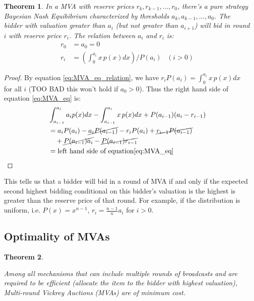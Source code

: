 \documentclass{aamas2012}
\newtheorem{theorem}{Theorem}
\begin{document}
\begin{theorem}
In a MVA with reserve prices $r_k, r_{k-1}, \ldots, r_0$, there's a pure
strategy Bayesian Nash Equibibrium characterized by thresholds $a_k, a_{k-1},
\ldots, a_0$.  The bidder with valuation greater than $a_i$ (but not greater
than $a_{i+1}$) will bid in round $i$ with reserve price $r_i$. The relation
between $a_i$ and $r_i$ is:
\begin{align}\label{eq:MVA_eq_relation}
  r_0 &= a_0 = 0 \nonumber \\
  r_i &= \left( \int_{0}^{a_i} x \, p(x) dx \right) / P(a_i) & (i > 0)
\end{align}
\end{theorem}

\begin{proof}
By equation \ref{eq:MVA_eq_relation}, we have $r_i P(a_i) = \int_{0}^{a_i}
x\,p(x)dx$ for all $i$ (TOO BAD this won't hold if $a_0 > 0$). Thus the right
hand side of equation \ref{eq:MVA_eq} is:
\begin{align*}
	& \int_{a_{i-1}}^{a_i} a_i p(x) dx - \int_{a_{i-1}}^{a_i} x \, p(x) dx + P(a_{i-1})(a_i-r_{i-1}) \\
	&= a_i P(a_i) - \cancel{a_i P(a_{i-1})} - r_i P(a_i) + \cancel{r_{i-1} P(a_{i-1})} \\
		& ~~~ + \cancel{P(a_{i-1}) a_i} - \cancel{P(a_{i-1}) r_{i-1}}\\
	&= \mbox{left hand side of equation\ref{eq:MVA_eq}}
\end{align*}
\end{proof}

This tells us that a bidder will bid in a round of MVA if and only if the
expected second highest bidding conditional on this bidder's valuation is the
highest is greater than the reserve price of that round. For example, if the
distribution is uniform, i.e. $P(x) = x^{n-1}$, $r_i = \frac{n-1}{n} a_i$ for
$i > 0$.

\subsection{Optimality of MVAs}

\begin{theorem}\label{theorem1}

Among all mechanisms that can include multiple rounds of broadcasts and are
required to be efficient (allocate the item to the bidder with highest
valuation), Multi-round Vickrey Auctions (MVAs) are of minimum cost.

\end{theorem}
\end{document}
